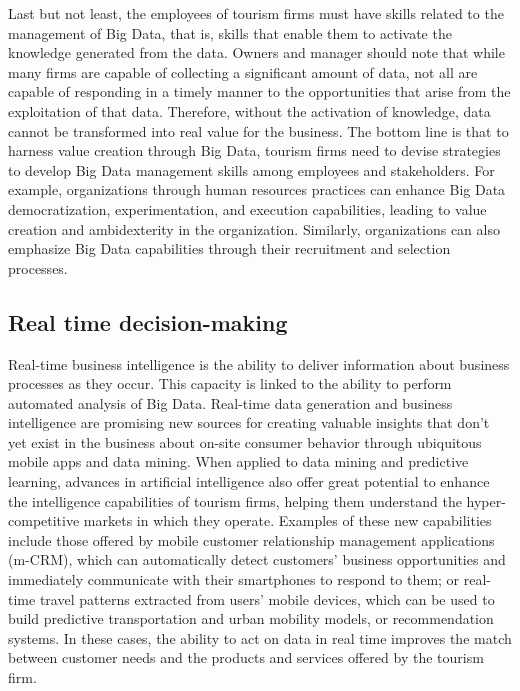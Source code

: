 \documentclass[
  letterpaper,
  DIV=11,
  numbers=noendperiod]{scrreprt}
\begin{document}
Last but not least, the employees of tourism firms must have skills
related to the management of Big Data, that is, skills that enable them
to activate the knowledge generated from the data. Owners and manager
should note that while many firms are capable of collecting a
significant amount of data, not all are capable of responding in a
timely manner to the opportunities that arise from the exploitation of
that data. Therefore, without the activation of knowledge, data cannot
be transformed into real value for the business. The bottom line is that
to harness value creation through Big Data, tourism firms need to devise
strategies to develop Big Data management skills among employees and
stakeholders. For example, organizations through human resources
practices can enhance Big Data democratization, experimentation, and
execution capabilities, leading to value creation and ambidexterity in
the organization. Similarly, organizations can also emphasize Big Data
capabilities through their recruitment and selection processes.

\hypertarget{real-time-decision-making}{%
\subsection{Real time decision-making}\label{real-time-decision-making}}

Real-time business intelligence is the ability to deliver information
about business processes as they occur. This capacity is linked to the
ability to perform automated analysis of Big Data. Real-time data
generation and business intelligence are promising new sources for
creating valuable insights that don't yet exist in the business about
on-site consumer behavior through ubiquitous mobile apps and data
mining. When applied to data mining and predictive learning, advances in
artificial intelligence also offer great potential to enhance the
intelligence capabilities of tourism firms, helping them understand the
hyper-competitive markets in which they operate. Examples of these new
capabilities include those offered by mobile customer relationship
management applications (m-CRM), which can automatically detect
customers' business opportunities and immediately communicate with their
smartphones to respond to them; or real-time travel patterns extracted
from users' mobile devices, which can be used to build predictive
transportation and urban mobility models, or recommendation systems. In
these cases, the ability to act on data in real time improves the match
between customer needs and the products and services offered by the
tourism firm.
\end{document}
